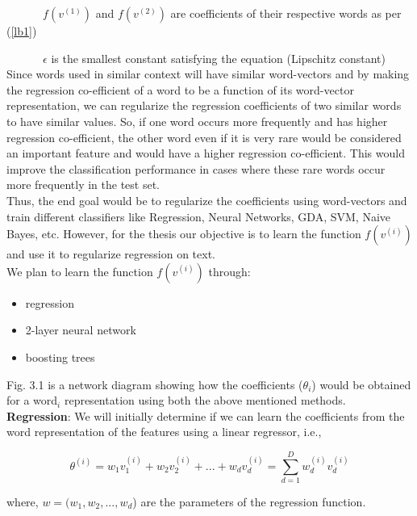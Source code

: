 $\quad\qquad\ f(v^{(1)})$ and $f(v^{(2)})$ are coefficients of their respective words as per (\ref{lb1})

$\quad\qquad\ \epsilon $ is the smallest constant satisfying the equation (Lipschitz constant)\\

Since words used in similar context will have similar word-vectors and by making the regression co-efficient of a word to be a function of its word-vector representation, we can regularize the regression coefficients of two similar words to have similar values. So, if one word occurs more frequently and has higher regression co-efficient, the other word even if it is very rare would be considered an important feature and would have a higher regression co-efficient. This would improve the classification performance in cases where these rare words occur more frequently in the test set.\\

Thus, the end goal would be to regularize the coefficients using word-vectors and train different classifiers like Regression, Neural Networks, GDA, SVM, Naive Bayes, etc. However, for the thesis our objective is to learn the function $f(v^{(i)})$ and use it to regularize regression on text. \\

\noindent We plan to learn the function $f(v^{(i)})$ through:

\begin{itemize}
\item regression
\item 2-layer neural network
\item boosting trees
\end{itemize}

\noindent Fig. 3.1 is a network diagram showing how the coefficients ($\theta_{i}$) would be obtained for a word$_{i}$ representation using both the above mentioned methods.\\

\noindent\textbf{Regression}: We will initially determine if we can learn the coefficients from the word representation of the features using a linear regressor, i.e., 

\begin{equation}
\theta^{(i)} = w_{1}v_{1}^{(i)} + w_{2}v_{2}^{(i)} + ... + w_{d}v_{d}^{(i)} = \sum_{d=1}^{D} w_{d}^{(i)}v_{d}^{(i)}
\end{equation}

where, $w = (w_{1}, w_{2}, ..., w_{d}$) are the parameters of the regression function. 

